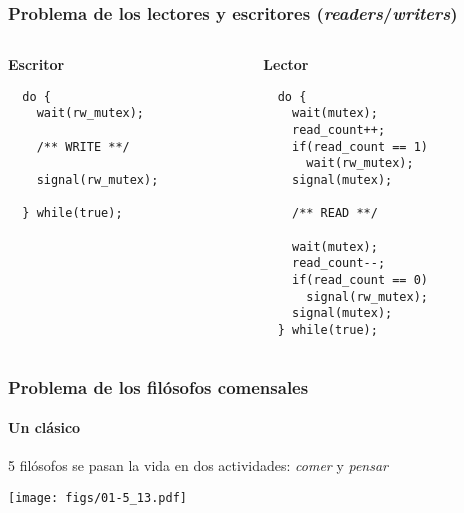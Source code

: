 \documentclass[letter]{beamer}
\begin{document}
\begin{frame}[fragile]
  \frametitle{Problema de los lectores y escritores ({\em readers}/{\em writers})}

  \begin{columns}[c]
    \begin{column}[T]{6cm}
      \begin{center}
        {\bf Escritor}
      \end{center}
\begin{verbatim}
  do {
    wait(rw_mutex);

    /** WRITE **/
    
    signal(rw_mutex);

  } while(true);
\end{verbatim}
    \end{column}
    
    \begin{column}[T]{6cm}
      \begin{center}
        {\bf Lector}
      \end{center}
\begin{verbatim}
  do {
    wait(mutex);
    read_count++;
    if(read_count == 1)
      wait(rw_mutex);
    signal(mutex);
    
    /** READ **/
    
    wait(mutex);
    read_count--;
    if(read_count == 0)
      signal(rw_mutex);
    signal(mutex);
  } while(true);
\end{verbatim}
    \end{column}
  \end{columns}


\end{frame}
\begin{frame}
  \frametitle{Problema de los filósofos comensales}
  \framesubtitle{Un clásico}

  5 filósofos se pasan la vida en dos actividades: {\em comer} y {\em pensar}
  
  \begin{center}
      \texttt{[image: figs/01-5\_13.pdf]}
  \end{center}
  
  
   
\end{frame}
\end{document}
